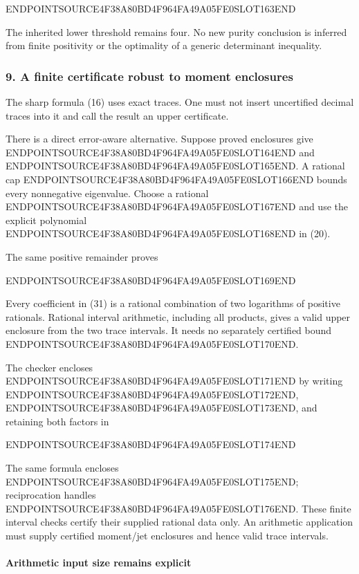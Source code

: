 ENDPOINTSOURCE4F38A80BD4F964FA49A05FE0SLOT163END

The inherited lower threshold remains four. No new purity conclusion is inferred from finite positivity or the optimality of a generic determinant inequality.

\subsubsection{9. A finite certificate robust to moment enclosures}\label{endpoint-relation_moment_original--a-finite-certificate-robust-to-moment-enclosures}

The sharp formula (16) uses exact traces. One must not insert uncertified decimal traces into it and call the result an upper certificate.

There is a direct error-aware alternative. Suppose proved enclosures give ENDPOINTSOURCE4F38A80BD4F964FA49A05FE0SLOT164END and ENDPOINTSOURCE4F38A80BD4F964FA49A05FE0SLOT165END. A rational cap ENDPOINTSOURCE4F38A80BD4F964FA49A05FE0SLOT166END bounds every nonnegative eigenvalue. Choose a rational ENDPOINTSOURCE4F38A80BD4F964FA49A05FE0SLOT167END and use the explicit polynomial ENDPOINTSOURCE4F38A80BD4F964FA49A05FE0SLOT168END in (20).

The same positive remainder proves

ENDPOINTSOURCE4F38A80BD4F964FA49A05FE0SLOT169END

Every coefficient in (31) is a rational combination of two logarithms of positive rationals. Rational interval arithmetic, including all products, gives a valid upper enclosure from the two trace intervals. It needs no separately certified bound ENDPOINTSOURCE4F38A80BD4F964FA49A05FE0SLOT170END.

The checker encloses ENDPOINTSOURCE4F38A80BD4F964FA49A05FE0SLOT171END by writing ENDPOINTSOURCE4F38A80BD4F964FA49A05FE0SLOT172END, ENDPOINTSOURCE4F38A80BD4F964FA49A05FE0SLOT173END, and retaining both factors in

ENDPOINTSOURCE4F38A80BD4F964FA49A05FE0SLOT174END

The same formula encloses ENDPOINTSOURCE4F38A80BD4F964FA49A05FE0SLOT175END; reciprocation handles ENDPOINTSOURCE4F38A80BD4F964FA49A05FE0SLOT176END. These finite interval checks certify their supplied rational data only. An arithmetic application must supply certified moment/jet enclosures and hence valid trace intervals.

\paragraph{Arithmetic input size remains explicit}\label{endpoint-relation_moment_original--arithmetic-input-size-remains-explicit}

